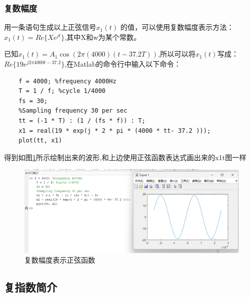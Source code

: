\documentclass[UTF8]{ctexart}
\begin{document}
\subsubsection{复数幅度}
\begin{framed}
    用一条语句生成以上正弦信号$x_1(t)$ 的值，可以使用复数幅度表示方法：$x_1(t) = Re\{Xe^{jt}\}$,其中X和w为某个常数。
\end{framed}
已知$x_1(t)=A_1\cos(2\pi(4000)(t-37.2T))$,所以可以将$x_1(t)$写成：$Re\{19e^{j2\pi{4000t-37.2}}\}$,在Matlab的命令行中输入以下命令：
\begin{verbatim}
    f = 4000; %frequency 4000Hz
    T = 1 / f; %cycle 1/4000
    fs = 30;
    %Sampling frequency 30 per sec
    tt = (-1 * T) : (1 / (fs * f)) : T;
    x1 = real(19 * exp(j * 2 * pi * (4000 * tt- 37.2 )));
    plot(tt, x1)
\end{verbatim}
得到如图\ref{img:complex_amplitude}所示绘制出来的波形,和上边使用正弦函数表达式画出来的x1t图一样
\begin{figure}[htbp]
    \centering
    \includegraphics[width=0.7\linewidth]{complex_amplitude.png}
    \caption{复数幅度表示正弦函数}
    \label{img:complex_amplitude}
\end{figure}
\subsection{复指数简介}
\end{document}

